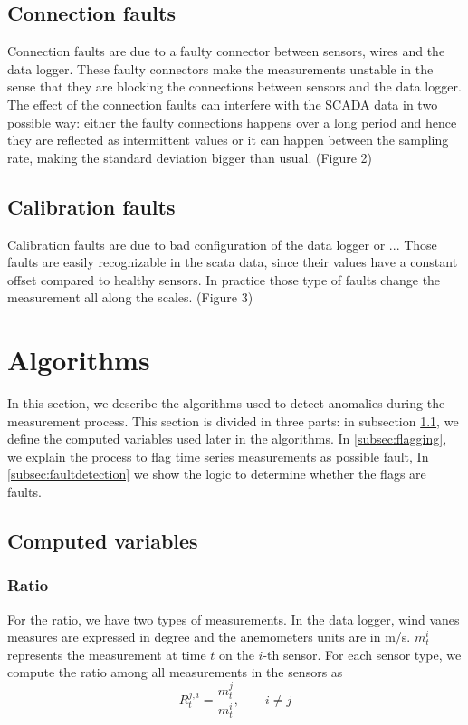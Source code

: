 \documentclass[journal]{IEEEtran}
\begin{document}
\subsection{Connection  faults}Connection faults are due to a faulty connector between sensors, wires and the data logger. These faulty connectors make the measurements unstable in the sense that they are blocking the connections between sensors and the data logger. The effect of the connection faults can interfere with the SCADA data in two possible way: either the faulty connections happens over a long period and hence they are reflected as intermittent values or it can happen between the sampling rate, making the standard deviation bigger than usual. (Figure 2) 
\subsection{Calibration faults} 
Calibration faults are due to bad configuration of the data logger or ... Those faults are easily recognizable in the scata data, since their values have a constant offset compared to healthy sensors. In practice those type of faults change the measurement all along the scales. (Figure 3)



\section{Algorithms}\label{sec:algorithms}
In this section, we describe the algorithms used to detect anomalies during the measurement process. This section is divided in three parts: in subsection \ref{subsec:computedvariables}, we define the computed variables used later in the algorithms. In \ref{subsec:flagging}, we explain the process to flag time series measurements as possible fault, In
\ref{subsec:faultdetection} we show the logic to determine whether the flags are faults.  
\subsection{Computed variables}\label{subsec:computedvariables}
\subsubsection{Ratio}
For the ratio, we have two types of measurements. In the data logger, wind vanes measures are expressed in degree and the anemometers units are in m/s.  $m_t^{i}$ represents the measurement at time $t$ on the $i$-th sensor.
For each sensor type, we compute the ratio among all measurements in the sensors as
\begin{equation}
R_{t}^{j,i} = \frac{m_{t}^{j}}{m_{t}^{i}},\qquad i \neq j 
\end{equation}
\end{document}
